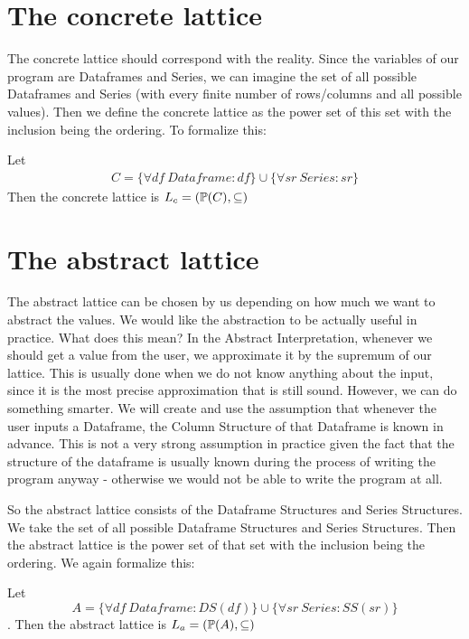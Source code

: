 \section{The concrete lattice}

The concrete lattice should correspond with the reality.
Since the variables of our program are Dataframes and Series, we can imagine the set of all possible Dataframes and
Series (with every finite number of rows/columns and all possible values).
Then we define the concrete lattice as the power set of this set with the inclusion being the ordering. %
To formalize this:

\begin{defn}

    Let
    \begin{gather*}
        C = \{\forall df \: Dataframe: df\} \cup \{\forall sr \: Series: sr\}
    \end{gather*}
    Then the concrete lattice is $L_c = (\mathbb{P}(C), \subseteq)$
\end{defn}


\section{The abstract lattice}

The abstract lattice can be chosen by us depending on how much we want to abstract the values.
We would like the abstraction to be actually useful in practice.
What does this mean?
In the Abstract Interpretation, whenever we should get a value from the user, we approximate it by the supremum of our
lattice.
This is usually done when we do not know anything about the input, since it is the most precise approximation that is
still sound.
However, we can do something smarter.
We will create and use the assumption that whenever the user inputs a Dataframe, the Column Structure of that Dataframe
is known in advance.
This is not a very strong assumption in practice given the fact that the structure of the dataframe is usually known
during the process of writing the program anyway - otherwise we would not be able to write the program at all.

So the abstract lattice consists of the Dataframe Structures and Series Structures.
We take the set of all possible Dataframe Structures and Series Structures.
Then the abstract lattice is the power set of that set with the inclusion being the ordering.
We again formalize this:

\begin{defn}

    Let
    \[A = \{\forall df\: Dataframe: DS(df)\} \cup \{\forall sr \: Series: SS(sr)\}\].
    Then the abstract lattice is $L_a = (\mathbb{P}(A), \subseteq)$
\end{defn}

